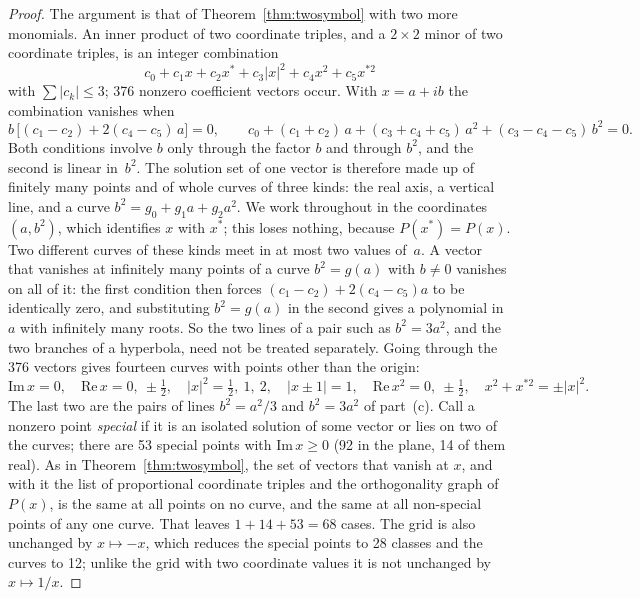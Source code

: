 \begin{proof}
The argument is that of Theorem~\ref{thm:twosymbol} with two more monomials.  An inner product of
two coordinate triples, and a $2\times2$ minor of two coordinate triples, is an integer combination
\[
c_0+c_1x+c_2x^{*}+c_3|x|^2+c_4x^2+c_5x^{*2}
\]
with $\sum|c_k|\le3$; 376 nonzero coefficient vectors occur.  With $x=a+ib$ the combination
vanishes when
\[
b\,\bigl[(c_1-c_2)+2(c_4-c_5)\,a\bigr]=0,\qquad
c_0+(c_1+c_2)\,a+(c_3+c_4+c_5)\,a^2+(c_3-c_4-c_5)\,b^2=0 .
\]
Both conditions involve $b$ only through the factor $b$ and through $b^2$, and the second is
linear in~$b^2$.  The solution set of one vector is therefore made up of finitely many points
and of whole curves of three kinds: the real axis, a vertical line, and a curve
$b^2=g_0+g_1a+g_2a^2$.  We work throughout in the coordinates $(a,b^2)$, which identifies $x$
with $x^{*}$; this loses nothing, because $P(x^{*})=P(x)$.  Two different curves of these kinds
meet in at most two values of~$a$.  A vector that vanishes at infinitely many points of a curve
$b^2=g(a)$ with $b\ne0$ vanishes on all of it: the first condition then forces
$(c_1-c_2)+2(c_4-c_5)a$ to be identically zero, and substituting $b^2=g(a)$ in the second
gives a polynomial in $a$ with infinitely many roots.  So the two lines of a pair such as
$b^2=3a^2$, and the two branches of a hyperbola, need not be treated separately.
Going through the 376 vectors gives fourteen curves with points other than the origin:
\[
\mathrm{Im}\,x=0,\quad \mathrm{Re}\,x=0,\ \pm\tfrac12,\quad |x|^2=\tfrac12,\ 1,\ 2,\quad
|x\pm1|=1,\quad \mathrm{Re}\,x^2=0,\ \pm\tfrac12,\quad x^2+x^{*2}=\pm|x|^2 .
\]
The last two are the pairs of lines $b^2=a^2/3$ and $b^2=3a^2$ of part~(c).  Call a nonzero point
\emph{special} if it is an isolated solution of some vector or lies on two of the curves; there
are 53 special points with $\mathrm{Im}\,x\ge0$ (92 in the plane, 14 of them real).  As in Theorem~\ref{thm:twosymbol}, the set of vectors that vanish at $x$,
and with it the list of proportional coordinate triples and the orthogonality graph of $P(x)$, is the same at
all points on no curve, and the same at all non-special points of any one curve.  That leaves
$1+14+53=68$ cases.  The grid is also unchanged by $x\mapsto-x$, which reduces
the special points to 28 classes and the curves to 12; unlike the grid with two coordinate values it is not
unchanged by $x\mapsto1/x$.


\end{proof}
